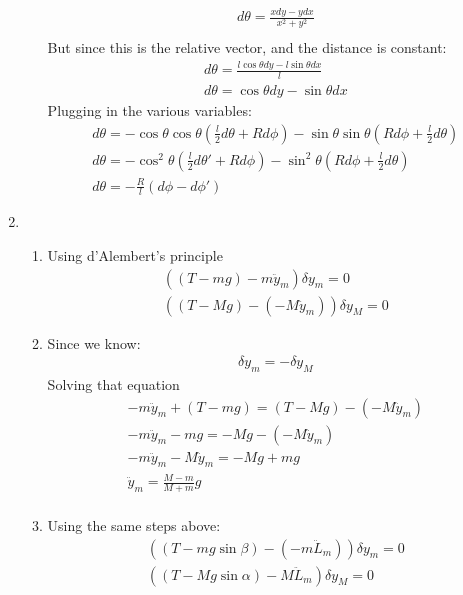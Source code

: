 \documentclass[12pt]{article}
\begin{document}
\begin{enumerate}
\begin{enumerate}
\begin{gather*}
        d\theta=\frac{xdy-ydx}{x^2+y^2}\\
      \end{gather*}
      But since this is the relative vector, and the distance is constant:
      \begin{gather*}
        d\theta=\frac{l\cos\theta dy-l\sin\theta dx}{l}\\
        d\theta=\cos\theta dy-\sin\theta dx
      \end{gather*}
      Plugging in the various variables:
      \begin{gather*}
        d\theta=-\cos\theta \cos\theta\left(\frac{l}{2}d\theta+Rd\phi\right)-\sin\theta \sin\theta\left(Rd\phi+\frac{l}{2}d\theta\right)\\
        d\theta=-\cos^2\theta\left(\frac{l}{2}d\theta'+Rd\phi\right)- \sin^2\theta\left(Rd\phi+\frac{l}{2}d\theta\right)\\
        d\theta=-\frac{R}{l}(d\phi-d\phi')
      \end{gather*}
    \end{enumerate}
    \item
    \begin{enumerate}
      \item
      Using d'Alembert's principle
      \begin{gather*}
        ((T-mg)-m\ddot{y}_m)\delta y_m=0\\
        ((T-Mg)-(-M\ddot{y}_m))\delta y_M=0
      \end{gather*}
      \item
      Since we know:
      \begin{gather*}
        \delta y_m=-\delta y_M
      \end{gather*}
      Solving that equation
      \begin{gather*}
        -m\ddot{y}_m+(T-mg)=(T-Mg)-(-M\ddot{y}_m)\\
        -m\ddot{y}_m-mg=-Mg-(-M\ddot{y}_m)\\
        -m\ddot{y}_m-M\ddot{y}_m=-Mg+mg\\
        \ddot{y}_m=\frac{M-m}{M+m}g\\
      \end{gather*}
      \item
      Using the same steps above:
      \begin{gather*}
        ((T-mg\sin\beta)-(-m\ddot{L}_m))\delta y_m=0\\
        ((T-Mg\sin\alpha)-M\ddot{L}_m)\delta y_M=0
      \end{gather*}

\end{enumerate}
\end{enumerate}
\end{document}
